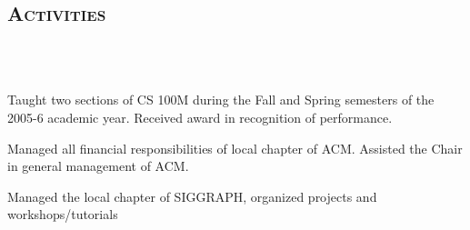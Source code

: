 \begin{resume}






\section{\textsc{Activities}}

\begin{formatb}
  \\
  \body\\
\end{formatb}

\begin{position}
Taught two sections of CS 100M during the Fall and Spring semesters of the 2005-6 academic year.  Received award in recognition of performance.
\end{position}

\begin{position}
Managed all financial responsibilities of local chapter of ACM.  Assisted the Chair in general management of ACM.
\end{position}

\begin{position}
Managed the local chapter of SIGGRAPH, organized projects and workshops/tutorials
\end{position}





\end{resume}
